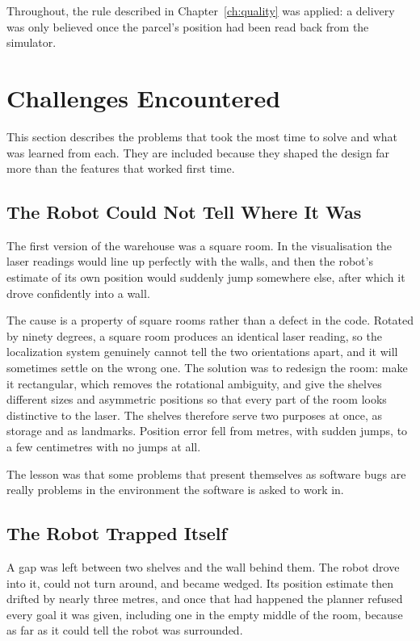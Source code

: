 \documentclass[12pt,a4paper]{report}
\begin{document}
Throughout, the rule described in Chapter~\ref{ch:quality} was applied: a delivery was only
believed once the parcel's position had been read back from the simulator.

\section{Challenges Encountered}
This section describes the problems that took the most time to solve and what was learned from
each. They are included because they shaped the design far more than the features that worked
first time.

\subsection{The Robot Could Not Tell Where It Was}
The first version of the warehouse was a square room. In the visualisation the laser readings would
line up perfectly with the walls, and then the robot's estimate of its own position would suddenly
jump somewhere else, after which it drove confidently into a wall.

The cause is a property of square rooms rather than a defect in the code. Rotated by ninety degrees,
a square room produces an identical laser reading, so the localization system genuinely cannot tell
the two orientations apart, and it will sometimes settle on the wrong one. The solution was to
redesign the room: make it rectangular, which removes the rotational ambiguity, and give the shelves
different sizes and asymmetric positions so that every part of the room looks distinctive to the
laser. The shelves therefore serve two purposes at once, as storage and as landmarks. Position error
fell from metres, with sudden jumps, to a few centimetres with no jumps at all.

The lesson was that some problems that present themselves as software bugs are really problems in
the environment the software is asked to work in.

\subsection{The Robot Trapped Itself}
A gap was left between two shelves and the wall behind them. The robot drove into it, could not turn
around, and became wedged. Its position estimate then drifted by nearly three metres, and once that
had happened the planner refused every goal it was given, including one in the empty middle of the
room, because as far as it could tell the robot was surrounded.
\end{document}
